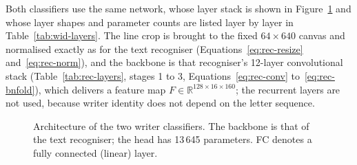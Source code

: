 Both classifiers use the same network, whose layer stack is shown in Figure~\ref{fig:wid-arch} and whose layer shapes and parameter counts are listed layer by layer in Table~\ref{tab:wid-layers}.
The line crop is brought to the fixed $64\times640$ canvas and normalised exactly as for the text recogniser (Equations~\ref{eq:rec-resize} and~\ref{eq:rec-norm}), and the backbone is that recogniser's 12-layer convolutional stack (Table~\ref{tab:rec-layers}, stages 1 to 3, Equations~\ref{eq:rec-conv} to~\ref{eq:rec-bnfold}), which delivers a feature map $F\in\mathbb R^{128\times16\times160}$; the recurrent layers are not used, because writer identity does not depend on the letter sequence.

\begin{figure}[h]
\centering
{}
\caption{Architecture of the two writer classifiers. The backbone is that of the text recogniser; the head has 13\,645 parameters. FC denotes a fully connected (linear) layer.}
\label{fig:wid-arch}
\end{figure}

